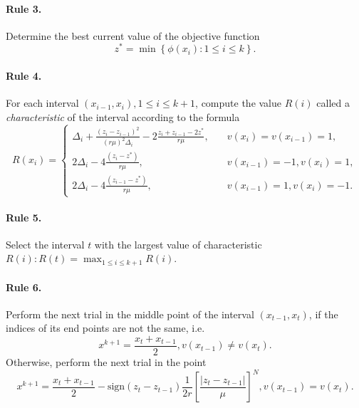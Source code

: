 \documentclass[runningheads]{llncs}
\begin{document}
\paragraph{Rule 3.} Determine the best current value of the objective function
\begin{equation}\label{eq8} 
z^*=\min \left\{ \phi (x_i): 1\leq i \leq k \right\}.
\end{equation}

\paragraph{Rule 4.} For each interval $(x_{i-1},x_i),1 \leq i \leq k+1$, compute the value $R(i)$ called a \textit{characteristic} of the interval according to the formula
\begin{equation}\label{eq9} 
R(x_i)=
  \begin{cases}
    \Delta _i+\frac {{(z_i-z_{i-1})}^2}{{(r \mu)}^2 \Delta _i} - 2 \frac {z_i+z_{i-1}-2z^*}{r \mu}, & {\quad  v(x_i)=v(x_{i-1})=1},\\
    2 \Delta _i-4 \frac {(z_i-z^*)}{r \mu}, & {\quad  v(x_{i-1})=-1, v(x_i)=1},\\
    2 \Delta _i-4 \frac {(z_{i-1}-z^*)}{r \mu}, & {\quad  v(x_{i-1})=1, v(x_i)=-1.}
  \end{cases}
\end{equation}

\paragraph{Rule 5.} Select the interval $t$ with the largest value of characteristic $R(i):R(t)= \max_{1 \leq i \leq k+1} R(i)$.

\paragraph{Rule 6.} Perform the next trial in the middle point of the interval $(x_{t-1},x_t)$, if the indices of its end points are not the same, i.e.
\begin{equation}\label{eq10} 
x^{k+1}=\frac {x_t+x_{t-1}}{2}, v(x_{t-1})\neq v(x_t).
\end{equation}
Otherwise, perform the next trial in the point
\begin{equation}\label{eq11} 
x^{k+1}= \frac {x_t+x_{t-1}}{2} -  \text{sign} {(z_t-z_{t-1})} \frac{1}{2r} \left[\frac {{|z_t-z_{t-1}|}}{\mu} \right]^N, v(x_{t-1})=v(x_t).
\end{equation}
\end{document}
